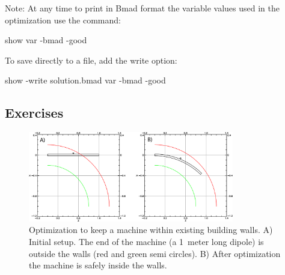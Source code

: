 \documentclass{hitec}     %
\begin{document}
{Note: At any time to print in Bmad format the variable values used in the optimization use the command:
\begin{code}
show var -bmad -good
\end{code}
To save directly to a file, add the write option:
\begin{code}
show -write solution.bmad var -bmad -good
\end{code}

\newpage

\subsection{Exercises}
\label{s:opt.ex}

\begin{figure}[tb]
  \centering
  \includegraphics[width=0.8\textwidth]{building-wall.pdf}
  \caption{
Optimization to keep a machine within existing building walls. A) Initial setup. The end of the machine (a
1~meter long dipole) is outside the walls (red and green semi circles). B) After optimization the machine is
safely inside the walls.}
  \label{f:b.wall}
\end{figure}

}
\end{document}
